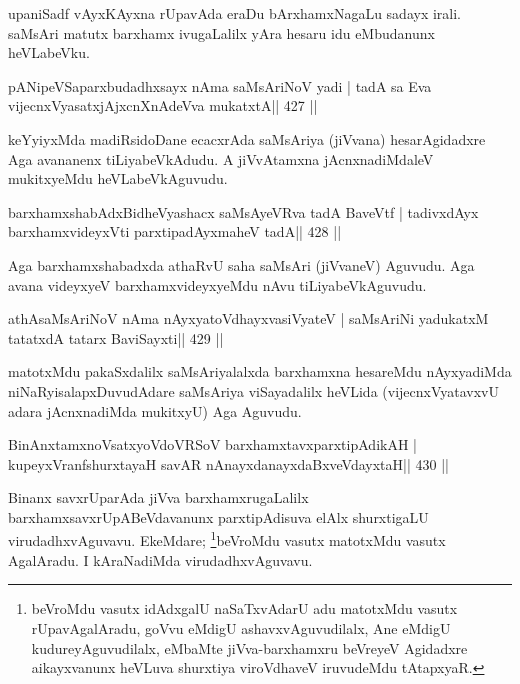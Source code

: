 \begin{artha}
upaniSadf vAyxKAyxna rUpavAda eraDu bArxhamxNagaLu sadayx irali. saMsAri matutx barxhamx ivugaLalilx yAra hesaru idu eMbudanunx heVLabeVku.
\end{artha}

\begin{shl}
pANipeVSaparxbudadhxsayx nAma saMsAriNoV yadi |
tadA sa Eva vijecnxVyasatxjAjxcnXnAdeVva mukatxtA\hfill || 427 ||
\end{shl}

\begin{artha}
keYyiyxMda madiRsidoDane ecacxrAda saMsAriya (jiVvana) hesarAgidadxre
Aga avananenx tiLiyabeVkAdudu. A jiVvAtamxna jAcnxnadiMdaleV
mukitxyeMdu heVLabeVkAguvudu.
\end{artha}


\begin{shl}
barxhamxshabAdxBidheVyashacx saMsAyeVRva tadA BaveVtf |
tadivxdAyx barxhamxvideyxVti parxtipadAyxmaheV tadA\hfill || 428 ||
\end{shl}

\begin{artha}
Aga barxhamxshabadxda athaRvU saha saMsAri (jiVvaneV) Aguvudu. Aga avana videyxyeV barxhamxvideyxyeMdu nAvu tiLiyabeVkAguvudu.
\end{artha}

\begin{shl}
athAsaMsAriNoV nAma nAyxyatoV\s dhayxvasiVyateV |
saMsAriNi yadukatxM tatatxdA tatarx BaviSayxti\hfill || 429 ||
\end{shl}

\begin{artha}
matotxMdu pakaSxdalilx saMsAriyalalxda barxhamxna hesareMdu nAyxyadiMda niNaRyisalapxDuvudAdare saMsAriya viSayadalilx heVLida (vijecnxVyatavxvU adara jAcnxnadiMda mukitxyU) Aga Aguvudu.
\end{artha}




\begin{shl}
BinAnxtamxnoVsatxyoVdoVRSoV barxhamxtavxparxtipAdikAH |
kupeyxVranfshurxtayaH savAR nAnayxdanayxdaBxveVdayxtaH\hfill || 430 ||
\end{shl}

\begin{artha}
Binanx savxrUparAda jiVva barxhamxrugaLalilx barxhamxsavxrUpABeVdavanunx
parxtipAdisuva elAlx shurxtigaLU virudadhxvAguvavu. EkeMdare; 
\footnote{beVroMdu vasutx idAdxgalU naSaTxvAdarU adu matotxMdu vasutx
rUpavAgalAradu, goVvu eMdigU ashavxvAguvudilalx, Ane eMdigU
kudureyAguvudilalx, eMbaMte jiVva-barxhamxru beVreyeV Agidadxre
aikayxvanunx heVLuva shurxtiya viroVdhaveV iruvudeMdu tAtapxyaR.}beVroMdu
vasutx matotxMdu vasutx AgalAradu. I kAraNadiMda virudadhxvAguvavu.
\end{artha}

